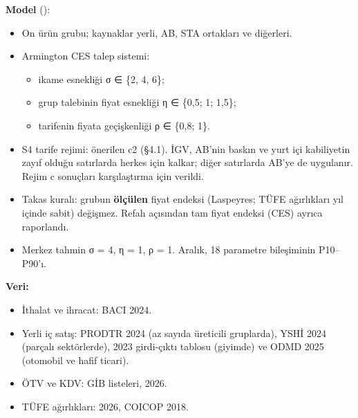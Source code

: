 \textbf{Model} ():

\begin{itemize}
\tightlist
\item
  On ürün grubu; kaynaklar yerli, AB, STA ortakları ve diğerleri.
\item
  Armington CES talep sistemi:

  \begin{itemize}
  \tightlist
  \item
    ikame esnekliği σ ∈ \{2, 4, 6\};
  \item
    grup talebinin fiyat esnekliği η ∈ \{0,5; 1; 1,5\};
  \item
    tarifenin fiyata geçişkenliği ρ ∈ \{0,8; 1\}.
  \end{itemize}
\item
  S4 tarife rejimi: önerilen c2 (§4.1). İGV, AB'nin baskın ve yurt içi kabiliyetin zayıf olduğu satırlarda herkes için kalkar; diğer satırlarda AB'ye de uygulanır. Rejim c sonuçları karşılaştırma için verildi.
\item
  Takas kuralı: grubun \textbf{ölçülen} fiyat endeksi (Laspeyres; TÜFE ağırlıkları yıl içinde sabit) değişmez. Refah açısından tam fiyat endeksi (CES) ayrıca raporlandı.
\item
  Merkez tahmin σ = 4, η = 1, ρ = 1. Aralık, 18 parametre bileşiminin P10--P90'ı.
\end{itemize}

\textbf{Veri:}

\begin{itemize}
\tightlist
\item
  İthalat ve ihracat: BACI 2024.
\item
  Yerli iç satış: PRODTR 2024 (az sayıda üreticili gruplarda), YSHİ 2024 (parçalı sektörlerde), 2023 girdi-çıktı tablosu (giyimde) ve ODMD 2025 (otomobil ve hafif ticari).
\item
  ÖTV ve KDV: GİB listeleri, 2026.
\item
  TÜFE ağırlıkları: 2026, COICOP 2018.
\end{itemize}

